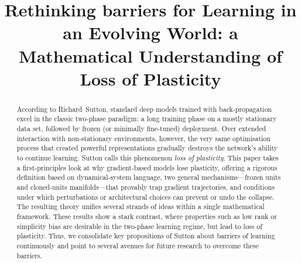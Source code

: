 \documentclass[11pt]{article}
\title{Rethinking barriers for Learning in an Evolving World: a Mathematical Understanding of Loss of Plasticity}
\date{}
\begin{document}
\maketitle

\begin{abstract}
According to Richard~Sutton, standard deep models trained with back‑propagation excel in the classic two‑phase paradigm: a long training phase on a mostly stationary data set, followed by frozen (or minimally fine‑tuned) deployment.  
Over extended interaction with non‑stationary environments, however, the very same optimisation process that created powerful representations gradually destroys the network’s ability to continue learning.  
Sutton calls this phenomenon \emph{loss of plasticity}.  
This paper takes a first‑principles look at why gradient‑based models lose plasticity, offering
a rigorous definition based on dynamical‑system language,  
two general mechanisms—frozen units and cloned‑units manifolds—that provably trap gradient trajectories, and  
conditions under which perturbations or architectural choices can prevent or undo the collapse.  
The resulting theory unifies several strands of ideas within a single mathematical framework. These results show a stark contrast, where properties such as low rank or simplicity bias are desirable in the two-phase learning regime, but lead to loss of plasticity. Thus, we consolidate key propositions of Sutton about barriers of learning continuously and point to several avenues for future research to overcome these barriers. 
\end{abstract}
\end{document}
